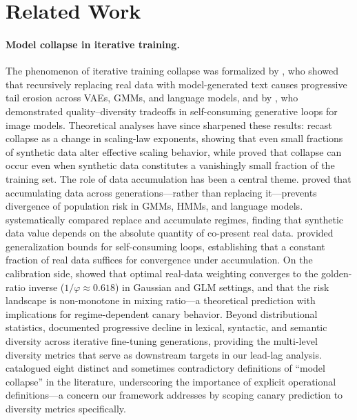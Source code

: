 \section{Related Work}
\label{sec:related_work}

\paragraph{Model collapse in iterative training.}

The phenomenon of iterative training collapse was formalized by \citet{shumailov2024curse}, who showed that recursively replacing real data with model-generated text causes progressive tail erosion across VAEs, GMMs, and language models, and by \citet{alemohammad2024mad}, who demonstrated quality--diversity tradeoffs in self-consuming generative loops for image models.
Theoretical analyses have since sharpened these results: \citet{dohmatob2024tale} recast collapse as a change in scaling-law exponents, showing that even small fractions of synthetic data alter effective scaling behavior, while \citet{dohmatob2025strong} proved that collapse can occur even when synthetic data constitutes a vanishingly small fraction of the training set.
The role of data accumulation has been a central theme.
\citet{dey2024breaking} proved that accumulating data across generations---rather than replacing it---prevents divergence of population risk in GMMs, HMMs, and language models.
\citet{kazdan2025collapse} systematically compared replace and accumulate regimes, finding that synthetic data value depends on the absolute quantity of co-present real data.
\citet{fu2025selfconsuming} provided generalization bounds for self-consuming loops, establishing that a constant fraction of real data suffices for convergence under accumulation.
On the calibration side, \citet{he2025golden} showed that optimal real-data weighting converges to the golden-ratio inverse ($1/\varphi \approx 0.618$) in Gaussian and GLM settings, and that the risk landscape is non-monotone in mixing ratio---a theoretical prediction with implications for regime-dependent canary behavior.
Beyond distributional statistics, \citet{guo2024linguistic} documented progressive decline in lexical, syntactic, and semantic diversity across iterative fine-tuning generations, providing the multi-level diversity metrics that serve as downstream targets in our lead-lag analysis.
\citet{schaeffer2025position} catalogued eight distinct and sometimes contradictory definitions of ``model collapse'' in the literature, underscoring the importance of explicit operational definitions---a concern our framework addresses by scoping canary prediction to diversity metrics specifically.

